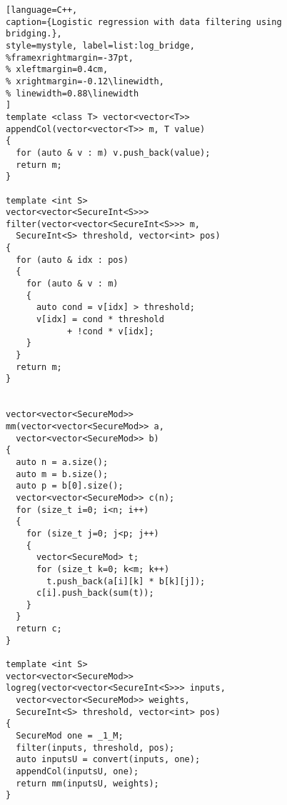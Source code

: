 \begin{figure}[b]
\begin{minipage}{\linewidth}
\begin{lstlisting}[language=C++,
caption={Logistic regression with data filtering using bridging.},
style=mystyle, label=list:log_bridge,
%framexrightmargin=-37pt,
% xleftmargin=0.4cm,
% xrightmargin=-0.12\linewidth,
% linewidth=0.88\linewidth
]
template <class T> vector<vector<T>>
appendCol(vector<vector<T>> m, T value)
{
  for (auto & v : m) v.push_back(value);
  return m;
}

template <int S>
vector<vector<SecureInt<S>>>
filter(vector<vector<SecureInt<S>>> m,
  SecureInt<S> threshold, vector<int> pos)
{
  for (auto & idx : pos)
  {
    for (auto & v : m)
    {
      auto cond = v[idx] > threshold;
      v[idx] = cond * threshold
            + !cond * v[idx];
    }
  }
  return m;
}


vector<vector<SecureMod>>
mm(vector<vector<SecureMod>> a,
  vector<vector<SecureMod>> b)
{
  auto n = a.size();
  auto m = b.size();
  auto p = b[0].size();
  vector<vector<SecureMod>> c(n);
  for (size_t i=0; i<n; i++)
  {
    for (size_t j=0; j<p; j++)
    {
      vector<SecureMod> t;
      for (size_t k=0; k<m; k++)
        t.push_back(a[i][k] * b[k][j]);
      c[i].push_back(sum(t));
    }
  }
  return c;
}

template <int S>
vector<vector<SecureMod>>
logreg(vector<vector<SecureInt<S>>> inputs,
  vector<vector<SecureMod>> weights,
  SecureInt<S> threshold, vector<int> pos)
{
  SecureMod one = _1_M;
  filter(inputs, threshold, pos);
  auto inputsU = convert(inputs, one);
  appendCol(inputsU, one);
  return mm(inputsU, weights);
}
\end{lstlisting}
\end{minipage}
\end{figure}
